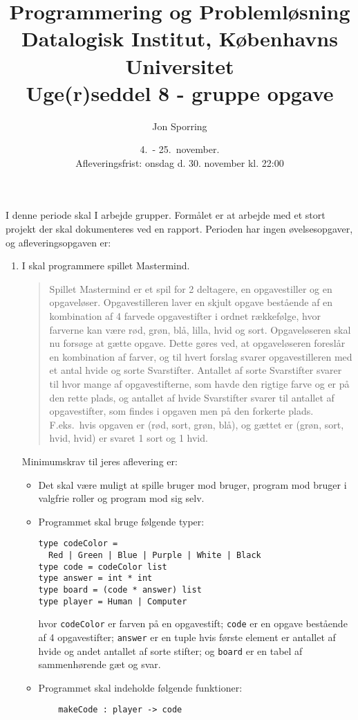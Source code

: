 \documentclass[a4paper,12pt]{article}
\title{Programmering og Problemløsning\\Datalogisk Institut,
  Københavns Universitet\\Uge(r)seddel 8 - gruppe opgave}
\author{Jon Sporring}
\date{4.\ - 25.\ november.\\Afleveringsfrist: onsdag d. 30. november kl. 22:00}
\begin{document}
\maketitle

I denne periode skal I arbejde grupper. Formålet er at arbejde med et stort projekt der skal dokumenteres ved en rapport. Perioden har ingen øvelsesopgaver, og afleveringsopgaven er:
\begin{enumerate}[label=8g.\arabic*,start=0]
\item I skal programmere spillet Mastermind. 
  \begin{quote}
    Spillet Mastermind er et spil for 2 deltagere, en opgavestiller og en opgaveløser. Opgavestilleren laver en skjult opgave bestående af en kombination af 4 farvede opgavestifter i ordnet rækkefølge, hvor farverne kan være rød, grøn, blå, lilla, hvid og sort. Opgaveløseren skal nu forsøge at gætte opgave. Dette gøres ved, at opgaveløseren foreslår en kombination af farver, og til hvert forslag svarer opgavestilleren med et antal hvide og sorte Svarstifter. Antallet af sorte Svarstifter svarer til hvor mange af opgavestifterne, som havde den rigtige farve og er på den rette plads, og antallet af hvide Svarstifter svarer til antallet af opgavestifter, som findes i opgaven men på den forkerte plads. F.eks.\ hvis opgaven er (rød, sort, grøn, blå), og gættet er (grøn, sort, hvid, hvid) er svaret 1 sort og 1 hvid.
  \end{quote}
  Minimumskrav til jeres aflevering er:
  \begin{itemize}
  \item Det skal være muligt at spille bruger mod bruger, program mod bruger i valgfrie roller og program mod sig selv.
  \item Programmet skal bruge følgende typer:
    \begin{lstlisting}
type codeColor = 
  Red | Green | Blue | Purple | White | Black
type code = codeColor list
type answer = int * int
type board = (code * answer) list
type player = Human | Computer
  \end{lstlisting}
hvor \lstinline!codeColor! er farven på en opgavestift; \lstinline!code! er en opgave bestående af 4 opgavestifter; \lstinline!answer! er en tuple hvis første element er antallet af hvide og andet antallet af sorte stifter; og \lstinline!board! er en tabel af sammenhørende gæt og svar.
\item Programmet skal indeholde følgende funktioner:
  \begin{lstlisting}
    makeCode : player -> code

\end{lstlisting}
\end{itemize}
\end{enumerate}
\end{document}

